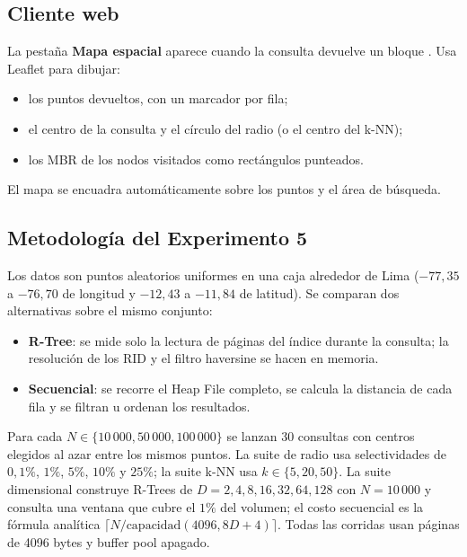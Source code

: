\subsection{Cliente web}

La pestaña \textbf{Mapa espacial} aparece cuando la consulta devuelve un bloque
. Usa Leaflet para dibujar:

\begin{itemize}
  \item los puntos devueltos, con un marcador por fila;
  \item el centro de la consulta y el círculo del radio (o el centro del k-NN);
  \item los MBR de los nodos visitados como rectángulos punteados.
\end{itemize}

El mapa se encuadra automáticamente sobre los puntos y el área de búsqueda.

\subsection{Metodología del Experimento 5}

Los datos son puntos aleatorios uniformes en una caja alrededor de Lima
(\(-77{,}35\) a \(-76{,}70\) de longitud y \(-12{,}43\) a \(-11{,}84\) de latitud).
Se comparan dos alternativas sobre el mismo conjunto:

\begin{itemize}
  \item \textbf{R-Tree}: se mide solo la lectura de páginas del índice durante la
        consulta; la resolución de los RID y el filtro haversine se hacen en
        memoria.
  \item \textbf{Secuencial}: se recorre el Heap File completo, se calcula la
        distancia de cada fila y se filtran u ordenan los resultados.
\end{itemize}

Para cada \(N \in \{10\,000, 50\,000, 100\,000\}\) se lanzan 30 consultas con
centros elegidos al azar entre los mismos puntos. La suite de radio usa
selectividades de \(0{,}1\%\), \(1\%\), \(5\%\), \(10\%\) y \(25\%\); la suite
k-NN usa \(k \in \{5, 20, 50\}\). La suite dimensional construye R-Trees de
\(D = 2, 4, 8, 16, 32, 64, 128\) con \(N = 10\,000\) y consulta una ventana que
cubre el \(1\%\) del volumen; el costo secuencial es la fórmula analítica
\(\lceil N / \text{capacidad}(4096, 8D+4) \rceil\). Todas las corridas usan
páginas de 4096 bytes y buffer pool apagado.

